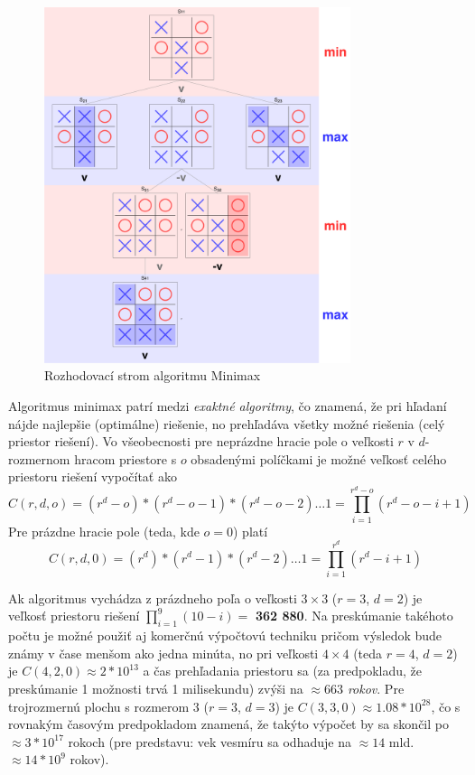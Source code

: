 \begin{figure}[H]
    \centering
    \includegraphics[width=0.8\textwidth]{images/minmax-tree.png}
    \caption{Rozhodovací strom algoritmu Minimax}
\end{figure}\label{figure:minimax-tree}

Algoritmus minimax patrí medzi \emph{exaktné algoritmy}, čo znamená, že pri hľadaní nájde najlepšie (optimálne)
riešenie, no prehľadáva všetky možné riešenia (celý priestor riešení).
Vo všeobecnosti pre neprázdne hracie pole o veľkosti $r$ v $d$-rozmernom hracom priestore s $o$ obsadenými políčkami je
možné veľkosť celého priestoru riešení vypočítať ako
\begin{equation}
    C(r, d, o) = (r^d - o) * (r^d - o - 1) * (r^d - o - 2) \dots 1 = \prod_{i = 1}^{r^d - o}{(r^d - o - i + 1)}
\end{equation}
Pre prázdne hracie pole (teda, kde $o = 0$) platí
\begin{equation}
    C(r, d, 0) = (r^d) * (r^d - 1) * (r^d - 2) \dots 1 = \prod_{i = 1}^{r^d}{(r^d - i + 1)}
\end{equation}

Ak algoritmus vychádza z prázdneho poľa o veľkosti $3 \times 3$ ($r = 3$, $d = 2$) je veľkosť priestoru riešení
$\prod_{i = 1}^{9}{(10 - i)} =$ \textbf{362 880}.
Na preskúmanie takéhoto počtu je možné použiť aj komerčnú výpočtovú techniku pričom výsledok bude známy v čase menšom
ako jedna minúta, no pri veľkosti $4 \times 4$ (teda $r = 4$, $d = 2$) je $C(4, 2, 0) \approx 2*10^{13}$ a čas
prehľadania priestoru sa (za predpokladu, že preskúmanie 1 možnosti trvá 1 milisekundu) zvýši na
\emph{$\approx 663$ rokov}.
Pre trojrozmernú plochu s rozmerom $3$ ($r = 3$, $d = 3$) je $C(3, 3, 0) \approx 1.08 * 10^{28}$, čo s rovnakým časovým
predpokladom znamená, že takýto výpočet by sa skončil po $\approx 3*10^{17}$ rokoch (pre predstavu: vek vesmíru sa
odhaduje na $\approx 14$ mld. $\approx 14 * 10^9$ rokov).

